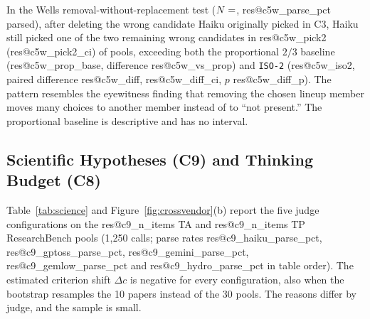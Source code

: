 \documentclass[10pt,twocolumn]{article}
\makeatletter
\newcommand{\res}[1]{\csname res@#1\endcsname}
\makeatother
\begin{document}
In the Wells removal-without-replacement test ($N=\res{c5w_n}$, \res{c5w_parse_pct} parsed), after deleting the wrong candidate Haiku originally picked in C3, Haiku still picked one of the two remaining wrong candidates in \res{c5w_pick2} (\res{c5w_pick2_ci}) of pools, exceeding both the proportional $2/3$ baseline (\res{c5w_prop_base}, difference \res{c5w_vs_prop}) and \texttt{ISO-2} (\res{c5w_iso2}, paired difference \res{c5w_diff}, \res{c5w_diff_ci}, $p$ \res{c5w_diff_p}). The pattern resembles the eyewitness finding that removing the chosen lineup member moves many choices to another member instead of to ``not present.'' The proportional baseline is descriptive and has no interval.

\subsection{Scientific Hypotheses (C9) and Thinking Budget (C8)}
Table~\ref{tab:science} and Figure~\ref{fig:crossvendor}(b) report the five judge configurations on the \res{c9_n_items} TA and \res{c9_n_items} TP ResearchBench pools (1,250 calls; parse rates \res{c9_haiku_parse_pct}, \res{c9_gptoss_parse_pct}, \res{c9_gemini_parse_pct}, \res{c9_gemlow_parse_pct} and \res{c9_hydro_parse_pct} in table order). The estimated criterion shift $\Delta c$ is negative for every configuration, also when the bootstrap resamples the 10 papers instead of the 30 pools. The reasons differ by judge, and the sample is small.
\end{document}
